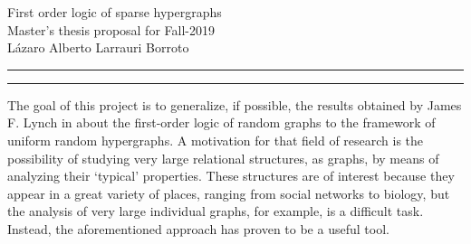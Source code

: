 \documentclass{article}
\newcommand{\soptitle}{First order logic of sparse hypergraphs}
\newcommand{\yourname}{Lázaro Alberto Larrauri Borroto}
\begin{document}
\begin{center}\LARGE\soptitle\\ 
\vspace{0.5cm}
\Large{Master's thesis proposal for Fall-2019} \\
\yourname
\end{center}

\hrule
\vspace{1pt}
\hrule height 1pt

\bigskip

The goal of this project is to generalize, if possible, the results obtained by 
James F. Lynch in \cite{lynch1992probabilities} about the first-order logic of random graphs to 
the framework of uniform random hypergraphs. A motivation for that field of research is the possibility
of studying very large relational structures, as graphs, by means of analyzing their `typical' properties. 
These structures are of interest because they appear in a great variety of places, ranging from social networks to 
biology, but the analysis of very large individual graphs, for example, is a difficult task. 
Instead, the aforementioned approach has proven to be a useful tool. \par
\end{document}

